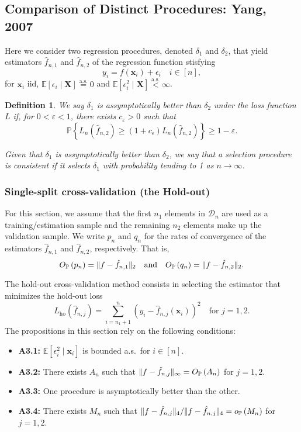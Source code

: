 \documentclass[12pt, letter paper]{article}
\newcommand{\1}{\mathmybb{1}}
\newtheorem{definition}{Definition}[section]
\newcommand{\0}{\emptyset}
\newcommand{\prob}{\mathbb{P}}
\newcommand{\Ep}[1]{\mathbb{E}\left[ #1 \right]}
\newcommand{\paren}[1]{\left(#1 \right)}
\newcommand{\set}[1]{\left\{ #1 \right\}}
\newcommand{\norm}[1]{|\hspace{-1pt}|#1 |\hspace{-1pt}|}
\newcommand{\data}{\mathcal{D}_{n}}
\newcommand{\aseq}{\stackrel{\mathrm{a.s.}}{=}}
\newcommand{\X}{\boldsymbol{X}}
\newcommand{\x}{\boldsymbol{x}}
\newcommand{\Loss}[1]{L_{n}\paren{#1}}
\newcommand{\op}[1]{o_{\prob}\paren{#1}}
\newcommand{\Op}[1]{O_{\prob}\paren{#1}}
\newcommand{\fhat}[2]{\hat{f}_{#1, #2}}
\begin{document}
\subsection{Comparison of Distinct Procedures: Yang, 2007}

Here we consider two regression procedures, denoted \(\delta_{1}\) and \(\delta_{2}\), that yield estimators \(\hat{f}_{n, 1}\) and \(\hat{f}_{n, 2}\) of the regression function stisfying
\begin{equation}\label{eq:regressionmodel}
    y_{i} = f(\x_{i}) + \epsilon_{i}\quad i\in[n],
\end{equation}
for \(\x_{i}\) iid, \(\Ep{\epsilon_{i}\mid \X} \aseq 0\) and \(\Ep{\epsilon_{i}^{2}\mid \X} \stackrel{\text{a.s.}}{<} \infty\).

\begin{definition}
    We say \(\delta_{1}\) is \emph{assymptotically better} than \(\delta_{2}\) under the loss function \(L\) if, for \(0<\varepsilon<1\), there exists \(c_{\varepsilon}>0\) such that
    \[\prob\set{\Loss{\fhat{n}{2}}\geq (1+c_{\epsilon})\Loss{\fhat{n}{2}} }\geq 1-\varepsilon.\]

    Given that \(\delta_{1}\) is assymptotically better than \(\delta_{2}\), we say that a selection procedure is consistent if it selects \(\delta_{1}\) with probability tending to 1 as \(n\to\infty\).
\end{definition}


\subsubsection{Single-split cross-validation (the Hold-out)}

For this section, we assume that the first \(n_1\) elements in \(\data\) are used as a training/estimation sample and the remaining \(n_2\) elements make up the validation sample. We write \(p_{n}\) and \(q_{n}\) for the rates of convergence of the estimators \(\fhat{n}{1}\) and \(\fhat{n}{2}\), respectively. That is,
\[\Op{p_{n}} = \norm{f - \fhat{n}{1}}_{2}\quad\text{and}\quad \Op{q_{n}} = \norm{f- \fhat{n}{2}}_{2}.\]

The hold-out cross-validation method consists in selecting the estimator that minimizes the hold-out loss
\[L_{\mathrm{ho}}(\fhat{n}{j}) = \sum_{i=n_{1}+1}^{n}\paren{y_{i} - \fhat{n}{j}(\x_{i})}^{2}\quad\text{for }j=1,2.\]
The propositions in this section rely on the following conditions:
\begin{itemize}
    \item \textbf{A3.1:} \(\Ep{\epsilon_{i}^{2}\mid \x_{i}}\) is bounded a.s.\ for \(i\in[n]\).
    \item \textbf{A3.2:} There exists \(A_{n}\) such that \(\norm{f-\fhat{n}{j}}_{\infty} = \Op{A_{n}}\) for \(j=1,2\).
    \item \textbf{A3.3:} One procedure is asymptotically better than the other.
    \item \textbf{A3.4:} There exists \(M_{n}\) such that \(\norm{f-\fhat{n}{j}}_{4} / \norm{f-\fhat{n}{j}}_{4} = \op{M_{n}}\) for \(j=1,2\).
\end{itemize}
\end{document}
